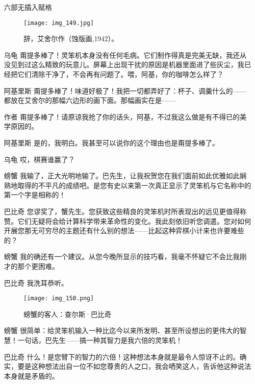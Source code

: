 \begin{dialog}{六部无插入赋格}
\begin{dialogue}
\begin{figure}
\texttt{[image: img\_149.jpg]}
\caption[辞，艾舍尔作。]
  {辞，艾舍尔作（蚀版画,1942）。}
\end{figure}

\item[乌龟]甭提多棒了！灵笨机本身没有任何毛病。它们制作得真是完美无缺，我还从没见到过这么精致的玩意儿。屏幕上出现干扰的原因是机器里面进了些灰尘，我已经把它们清除干净了，不会再有问题了。喂，阿基，你的咖啡怎么样了？

\item[阿基里斯]甭提多棒了！味道好极了！我把一切都弄好了：杯子、调羹什么的——都放在艾舍尔的那幅六边形的画下面。那幅画实在是——

\item[作者]甭提多棒了！请原谅我抢了你的话头，阿基，不过我这么做是有不得已的美学原因的。

\item[阿基里斯]是的，我明白。我甚至可以说你的这个理由也是甭提多棒了。

\item[乌龟]哎，棋赛谁赢了？

\item[螃蟹]我输了，正大光明地输了。巴先生，让我祝贺您在我们面前如此优雅如此娴熟地取得的不平凡的成绩吧。是您有史以来第一次真正显示了灵笨机与它名称中的第一个字是相称的！

\item[巴比奇]您谬奖了，蟹先生。您获致这些精良的灵笨机时所表现出的远见更值得称赞。它们无疑将会给计算科学带来革命性的变化。我此刻依旧听您调遣。您对如何开展您那无可穷尽的主题还有什么别的想法——比起这种弈棋小计来也许要难些的？

\item[螃蟹]我的确还有一个建议。从您今晚所显示的技巧看，我毫不怀疑它不会比我刚才的那个更困难。

\item[巴比奇]我洗耳恭听。

\begin{figure}
\texttt{[image: img\_150.png]}
\caption[查尔斯·巴比奇。]
  {螃蟹的客人：查尔斯·巴比奇}
\end{figure}

\item[螃蟹]很简单：给灵笨机输入一种比迄今以来所发明、甚至所设想出的更伟大的智慧！一句话，巴先生——搞一种其智力是我六倍的灵笨机！

\item[巴比奇]什么！是您臂下的智力的六倍！这种想法本身就是最令人惊讶不止的。确实，要是这种想法出自一位不如您尊贵的人之口，我会哂笑这人，告诉他这种说法本身就是矛盾的。


\end{dialogue}
\end{dialog}
